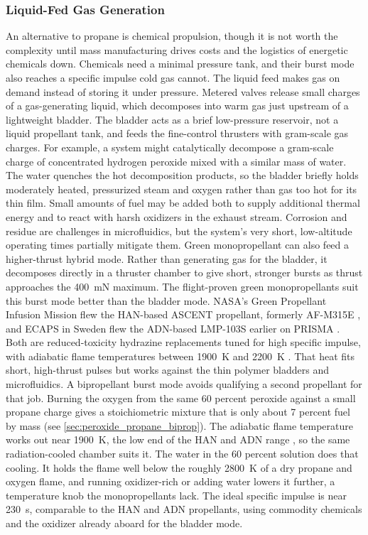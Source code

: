 \documentclass{article}
\begin{document}
\subsubsection{Liquid-Fed Gas Generation}
An alternative to propane is chemical propulsion, though it is not worth the complexity until mass manufacturing drives costs and the logistics of energetic chemicals down. Chemicals need a minimal pressure tank, and their burst mode also reaches a specific impulse cold gas cannot. The liquid feed makes gas on demand instead of storing it under pressure. Metered valves release small charges of a gas-generating liquid, which decomposes into warm gas just upstream of a lightweight bladder. The bladder acts as a brief low-pressure reservoir, not a liquid propellant tank, and feeds the fine-control thrusters with gram-scale gas charges. For example, a system might catalytically decompose a gram-scale charge of concentrated hydrogen peroxide mixed with a similar mass of water. The water quenches the hot decomposition products, so the bladder briefly holds moderately heated, pressurized steam and oxygen rather than gas too hot for its thin film. Small amounts of fuel may be added both to supply additional thermal energy and to react with harsh oxidizers in the exhaust stream. Corrosion and residue are challenges in microfluidics, but the system's very short, low-altitude operating times partially mitigate them. Green monopropellant can also feed a higher-thrust hybrid mode. Rather than generating gas for the bladder, it decomposes directly in a thruster chamber to give short, stronger bursts as thrust approaches the \SI{400}{\milli\newton} maximum. The flight-proven green monopropellants suit this burst mode better than the bladder mode. NASA's Green Propellant Infusion Mission flew the HAN-based ASCENT propellant, formerly AF-M315E \cite{spores2013gpim,mclean2020gpim_results}, and ECAPS in Sweden flew the ADN-based LMP-103S earlier on PRISMA \cite{anflo2009prisma,anflo2011hpgp_inspace}. Both are reduced-toxicity hydrazine replacements tuned for high specific impulse, with adiabatic flame temperatures between \SI{1900}{\kelvin} and \SI{2200}{\kelvin} \cite{green_monoprop_review}. That heat fits short, high-thrust pulses but works against the thin polymer bladders and microfluidics. A bipropellant burst mode avoids qualifying a second propellant for that job. Burning the oxygen from the same 60 percent peroxide against a small propane charge gives a stoichiometric mixture that is only about 7 percent fuel by mass (see \autoref{sec:peroxide_propane_biprop}). The adiabatic flame temperature works out near \SI{1900}{\kelvin}, the low end of the HAN and ADN range \cite{green_monoprop_review}, so the same radiation-cooled chamber suits it. The water in the 60 percent solution does that cooling. It holds the flame well below the roughly \SI{2800}{\kelvin} of a dry propane and oxygen flame, and running oxidizer-rich or adding water lowers it further, a temperature knob the monopropellants lack. The ideal specific impulse is near \SI{230}{\second}, comparable to the HAN and ADN propellants, using commodity chemicals and the oxidizer already aboard for the bladder mode.
\end{document}
